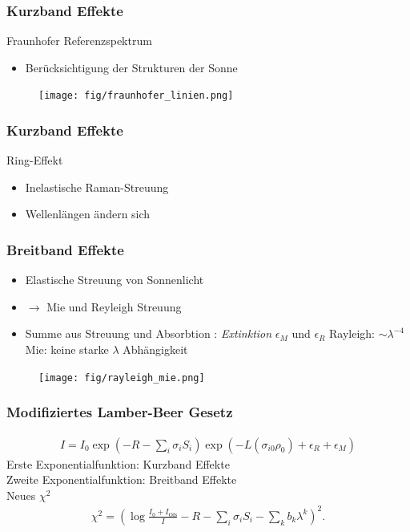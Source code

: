 \documentclass{beamer}
\begin{document}
\begin{frame}
    \frametitle{Kurzband Effekte}
Fraunhofer Referenzspektrum
    \begin{itemize}
        \item Berücksichtigung der Strukturen der Sonne
    \end{itemize}
    \begin{figure}[h]
        \texttt{[image: fig/fraunhofer\_linien.png]}
    \end{figure}
\end{frame}

\begin{frame}
\frametitle{Kurzband Effekte}
    Ring-Effekt
    \begin{itemize}
        \item Inelastische Raman-Streuung
        \item Wellenlängen ändern sich
    \end{itemize}
\end{frame}

\begin{frame}
    \frametitle{Breitband Effekte}
    \begin{itemize}
        \item Elastische Streuung von Sonnenlicht 
        \item $\to$ Mie und Reyleigh Streuung
        \item Summe aus Streuung und Absorbtion : \textit{Extinktion} $\epsilon_M$ und $\epsilon_R$
    Rayleigh: $\sim \lambda^{-4}$\\
    Mie: keine starke $\lambda$ Abhängigkeit
    \end{itemize}

    \begin{figure}
    \texttt{[image: fig/rayleigh\_mie.png]}
    \end{figure}
\end{frame}


\begin{frame}
    \frametitle{Modifiziertes Lamber-Beer Gesetz}
    \begin{align}
        I = I_0 \exp(-R - \sum_i \sigma_i S_i) \exp(-L (\sigma_{i0}\rho_0) + \epsilon_R + \epsilon_M)
    \end{align}
    Erste Exponentialfunktion: Kurzband Effekte\\
    Zweite Exponentialfunktion: Breitband Effekte\\
    \pause
    Neues $\chi^2$
    \begin{align}
        \chi^2 = \left( \log\frac{I_0 + I_\text{Ofs}}{I} - R - \sum_i \sigma_i S_i - \sum_k b_k \lambda^k \right)^2.
    \end{align}
\end{frame}
\end{document}
